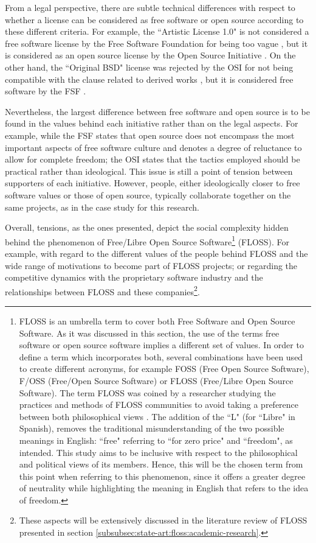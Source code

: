 From a legal perspective, there are subtle technical differences with respect to whether a license can be considered as free software or open source according to these different criteria. For example, the ``Artistic License 1.0" is not considered a free software license by the Free Software Foundation for being too vague \parencite{fsf-artistic1:2014:Online}, but it is considered as an open source license by the Open Source Initiative \parencite{osi-artistic1:2014:Online}. On the other hand, the ``Original BSD" license was rejected by the OSI for not being compatible with the clause related to derived works \parencite{osi-bsd3:2014:Online}, but it is considered free software by the FSF \parencite{fsf-bsd:2014:Online}.

Nevertheless, the largest difference between free software and open source is to be found in the values behind each initiative rather than on the legal aspects. For example, while the FSF states that open source does not encompass the most important aspects of free software culture and denotes a degree of reluctance to allow for complete freedom; the OSI states that the tactics employed should be practical rather than ideological. This issue is still a point of tension between supporters of each initiative. However, people, either ideologically closer to free software values or those of open source, typically collaborate together on the same projects, as in the case study for this research.

Overall, tensions, as the ones presented, depict the social complexity hidden behind the phenomenon of Free\slash Libre Open Source Software\footnote{FLOSS is an umbrella term to cover both Free Software and Open Source Software. As it was discussed in this section, the use of the terms free software or open source software implies a different set of values. In order to define a term which incorporates both, several combinations have been used to create different acronyms, for example FOSS (Free Open Source Software), F\slash OSS (Free\slash Open Source Software) or FLOSS (Free\slash Libre Open Source Software). The term FLOSS was coined by a researcher studying the practices and methods of FLOSS communities to avoid taking a preference between both philosophical views \parencite{fsf-floss-foss:2014:Online}. The addition of the ``L" (for ``Libre" in Spanish), removes the traditional misunderstanding of the two possible meanings in English: ``free" referring to ``for zero price" and ``freedom", as intended. This study aims to be inclusive with respect to the philosophical and political views of its members. Hence, this will be the chosen term from this point when referring to this phenomenon, since it offers a greater degree of neutrality while highlighting the meaning in English that refers to the idea of freedom.} (FLOSS). For example, with regard to the different values of the people behind FLOSS and the wide range of motivations to become part of FLOSS projects; or regarding the competitive dynamics with the proprietary software industry and the relationships between FLOSS and these companies\footnote{These aspects will be extensively discussed in the literature review of FLOSS presented in section \ref{subsubsec:state-art:floss:academic-research}.}.

